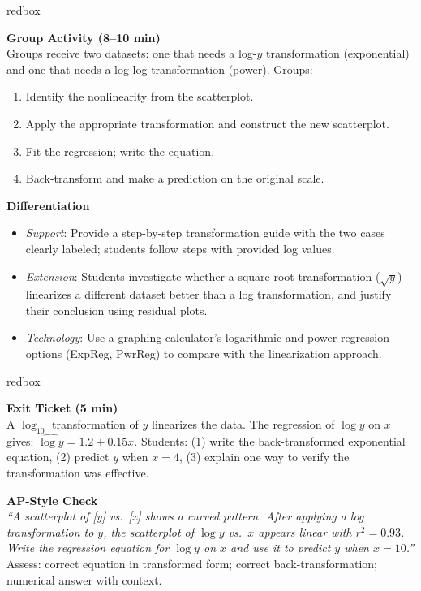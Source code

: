\documentclass[10pt]{article}
\begin{document}
\begin{skillbox}{redbox}
\begin{minipage}[t]{0.48\linewidth}
    \textbf{Group Activity (8--10 min)}\\
    Groups receive two datasets: one that needs a log-$y$ transformation (exponential) and one that needs a log-log transformation (power). Groups:
    \begin{enumerate}
        \item Identify the nonlinearity from the scatterplot.
        \item Apply the appropriate transformation and construct the new scatterplot.
        \item Fit the regression; write the equation.
        \item Back-transform and make a prediction on the original scale.
    \end{enumerate}
\end{minipage}
\hfill
\begin{minipage}[t]{0.48\linewidth}
    \textbf{Differentiation}
    \begin{itemize}
        \item \textit{Support}: Provide a step-by-step transformation guide with the two cases clearly labeled; students follow steps with provided log values.
        \item \textit{Extension}: Students investigate whether a square-root transformation ($\sqrt{y}$) linearizes a different dataset better than a log transformation, and justify their conclusion using residual plots.
        \item \textit{Technology}: Use a graphing calculator's logarithmic and power regression options (ExpReg, PwrReg) to compare with the linearization approach.
    \end{itemize}
\end{minipage}
\end{skillbox}

\begin{skillbox}{redbox}
\begin{minipage}[t]{0.48\linewidth}
    \textbf{Exit Ticket (5 min)}\\
    A $\log_{10}$ transformation of $y$ linearizes the data. The regression of $\log y$ on $x$ gives: $\widehat{\log y} = 1.2 + 0.15x$. Students: (1) write the back-transformed exponential equation, (2) predict $y$ when $x = 4$, (3) explain one way to verify the transformation was effective.
\end{minipage}
\hfill
\begin{minipage}[t]{0.48\linewidth}
    \textbf{AP-Style Check}\\
    \textit{``A scatterplot of [y] vs.\ [x] shows a curved pattern. After applying a log transformation to $y$, the scatterplot of $\log y$ vs.\ $x$ appears linear with $r^2 = 0.93$. Write the regression equation for $\log y$ on $x$ and use it to predict $y$ when $x = 10$.''}\\[4pt]
    Assess: correct equation in transformed form; correct back-transformation; numerical answer with context.
\end{minipage}
\end{skillbox}
\end{document}
